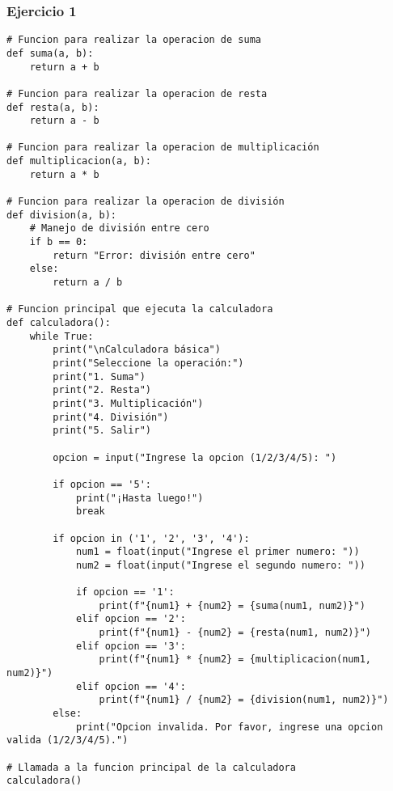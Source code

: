 \documentclass[10pt,a4paper]{article}
\begin{document}
\subsubsection{Ejercicio 1}
\begin{lstlisting}
# Funcion para realizar la operacion de suma
def suma(a, b):
    return a + b

# Funcion para realizar la operacion de resta
def resta(a, b):
    return a - b

# Funcion para realizar la operacion de multiplicación
def multiplicacion(a, b):
    return a * b

# Funcion para realizar la operacion de división
def division(a, b):
    # Manejo de división entre cero
    if b == 0:
        return "Error: división entre cero"
    else:
        return a / b

# Funcion principal que ejecuta la calculadora
def calculadora():
    while True:
        print("\nCalculadora básica")
        print("Seleccione la operación:")
        print("1. Suma")
        print("2. Resta")
        print("3. Multiplicación")
        print("4. División")
        print("5. Salir")

        opcion = input("Ingrese la opcion (1/2/3/4/5): ")

        if opcion == '5':
            print("¡Hasta luego!")
            break
        
        if opcion in ('1', '2', '3', '4'):
            num1 = float(input("Ingrese el primer numero: "))
            num2 = float(input("Ingrese el segundo numero: "))

            if opcion == '1':
                print(f"{num1} + {num2} = {suma(num1, num2)}")
            elif opcion == '2':
                print(f"{num1} - {num2} = {resta(num1, num2)}")
            elif opcion == '3':
                print(f"{num1} * {num2} = {multiplicacion(num1, num2)}")
            elif opcion == '4':
                print(f"{num1} / {num2} = {division(num1, num2)}")
        else:
            print("Opcion invalida. Por favor, ingrese una opcion valida (1/2/3/4/5).")

# Llamada a la funcion principal de la calculadora
calculadora()

\end{lstlisting}
\newpage
\end{document}
